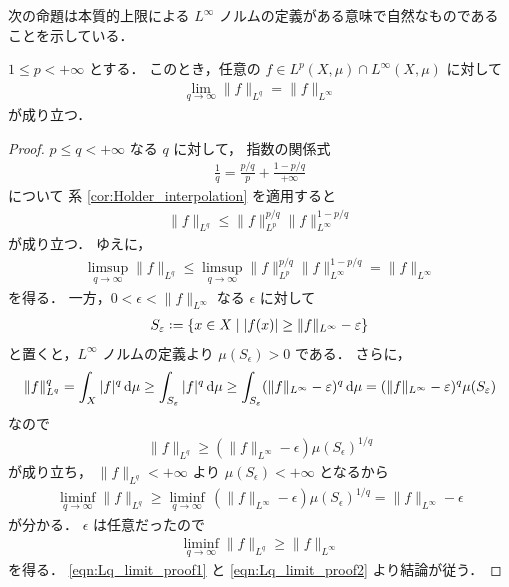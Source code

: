 次の命題は本質的上限による $L^\infty$ ノルムの定義がある意味で自然なものであることを示している．

\begin{proposition}
    $1\le p<+\infty$ とする．
    このとき，任意の $f\in L^p(X,\mu)\cap L^\infty(X,\mu)$ に対して
    \begin{align*}
        \lim_{q\to\infty}\|f\|_{L^q}=\|f\|_{L^\infty}
    \end{align*}
    が成り立つ．
\end{proposition}

\begin{proof}
    $p\le q<+\infty$ なる $q$ に対して，
    指数の関係式
    \begin{align*}
        \frac{1}{q}=\frac{p/q}{p}+\frac{1-p/q}{+\infty}
    \end{align*}
    について
    系 \ref{cor:Holder_interpolation} を適用すると
    \begin{align*}
        \|f\|_{L^q}\le\|f\|_{L^p}^{p/q}\|f\|_{L^\infty}^{1-p/q}
    \end{align*}
    が成り立つ．
    ゆえに，
    \begin{align}
        \limsup_{q\to\infty}\|f\|_{L^q}
        \le\limsup_{q\to\infty}\|f\|_{L^p}^{p/q}\|f\|_{L^\infty}^{1-p/q}
        =\|f\|_{L^\infty}
        \label{eqn:Lq_limit_proof1}
    \end{align}
    を得る．
    一方，$0<\epsilon<\|f\|_{L^\infty}$ なる $\epsilon$ に対して
    \begin{align*}
        S_\epsilon\defeq\{x\in X\mid|f(x)|\ge\|f\|_{L^\infty}-\epsilon\}
    \end{align*}
    と置くと，$L^\infty$ ノルムの定義より $\mu(S_\epsilon)>0$ である．
    さらに，
    \begin{align*}
        \|f\|_{L^q}^q
        =\int_X|f|^q\,\mathrm{d}\mu
        \ge\int_{S_\varepsilon}|f|^q\,\mathrm{d}\mu
        \ge\int_{S_\varepsilon}(\|f\|_{L^\infty}-\varepsilon)^q\,\mathrm{d}\mu
        =(\|f\|_{L^\infty}-\varepsilon)^q\mu(S_\varepsilon)
    \end{align*}
    なので
    \begin{align*}
        \|f\|_{L^q}
        \ge(\|f\|_{L^\infty}-\epsilon)\mu(S_\epsilon)^{1/q}
    \end{align*}
    が成り立ち，
    $\|f\|_{L^q}<+\infty$ より $\mu(S_\epsilon)<+\infty$ となるから
    \begin{align*}
        \liminf_{q\to\infty}\|f\|_{L^q}
        \ge\liminf_{q\to\infty}\,(\|f\|_{L^\infty}-\epsilon)\mu(S_\epsilon)^{1/q}
        =\|f\|_{L^\infty}-\epsilon
    \end{align*}
    が分かる．
    $\epsilon$ は任意だったので
    \begin{align}
        \liminf_{q\to\infty}\|f\|_{L^q}\ge\|f\|_{L^\infty}
        \label{eqn:Lq_limit_proof2}
    \end{align}
    を得る．
    \eqref{eqn:Lq_limit_proof1} と \eqref{eqn:Lq_limit_proof2} より結論が従う．
\end{proof}

